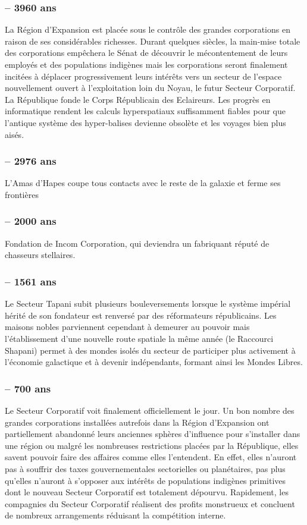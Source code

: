 \documentclass[twoside]{article}
\begin{document}
\subsubsection*{-- 3960 ans} 
La Région d'Expansion est placée sous le contrôle des grandes corporations en raison de ses considérables richesses. Durant quelques siècles, la main-mise totale des corporations empêchera le Sénat de découvrir le mécontentement de leurs employés et des populations indigènes mais les corporations seront finalement incitées à déplacer progressivement leurs intérêts vers un secteur de l'espace nouvellement ouvert à l'exploitation loin du Noyau, le futur Secteur Corporatif. 
La République fonde le Corps Républicain des Eclaireurs. 
Les progrès en informatique rendent les calculs hyperspatiaux suffisamment fiables pour que l'antique système des hyper-balises devienne obsolète et les voyages bien plus aisés. 
\subsubsection*{-- 2976 ans} 
L'Amas d'Hapes coupe tous contacts avec le reste de la galaxie et ferme ses frontières 
\subsubsection*{-- 2000 ans} 
Fondation de Incom Corporation, qui deviendra un fabriquant réputé de chasseurs stellaires. 
\subsubsection*{-- 1561 ans} 
Le Secteur Tapani subit plusieurs bouleversements lorsque le système impérial hérité de son fondateur est renversé par des réformateurs républicains. Les maisons nobles parviennent cependant à demeurer au pouvoir mais l'établissement d'une nouvelle route spatiale la même année (le Raccourci Shapani) permet  à des mondes isolés du secteur de participer plus activement à l'économie galactique et à devenir indépendants, formant ainsi les Mondes Libres. 
\subsubsection*{-- 700 ans} 
Le Secteur Corporatif voit finalement officiellement le jour. Un bon nombre des grandes corporations installées autrefois dans la Région d'Expansion ont partiellement abandonné leurs anciennes sphères d'influence pour s'installer dans une région ou malgré les nombreuses restrictions placées par la République, elles savent pouvoir faire des affaires comme elles l'entendent. En effet,  elles n'auront pas à souffrir des taxes gouvernementales sectorielles ou planétaires, pas plus qu'elles n'auront à s'opposer aux intérêts de populations indigènes primitives dont le nouveau Secteur Corporatif est totalement dépourvu. Rapidement, les compagnies du Secteur Corporatif réalisent des profits monstrueux et concluent de nombreux arrangements réduisant la compétition interne. \\
\end{document}
